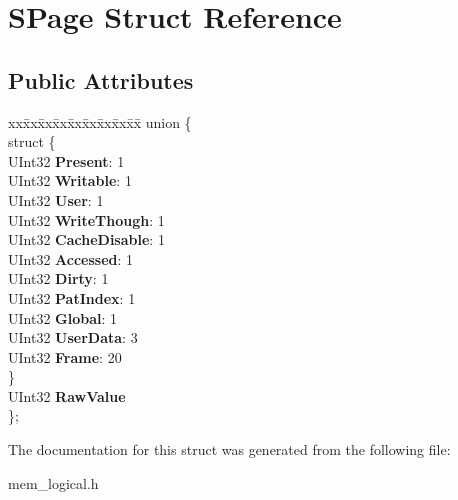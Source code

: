 \hypertarget{struct_s_page}{}\section{S\+Page Struct Reference}
\label{struct_s_page}
\subsection*{Public Attributes}
\begin{DoxyCompactItemize}
\item 
\mbox{\label{struct_s_page_a471494db4301c74e655d9178d6d98143}} 
\begin{tabbing}
xx\=xx\=xx\=xx\=xx\=xx\=xx\=xx\=xx\=\kill
union \{\\
\mbox{\label{union_s_page_1_1_0D22_a4ca04a5e242f5af34fafeb0bfaa527f7}} 
\>struct \{\\
\>\>UInt32 {\bfseries Present}: 1\\
\>\>UInt32 {\bfseries Writable}: 1\\
\>\>UInt32 {\bfseries User}: 1\\
\>\>UInt32 {\bfseries WriteThough}: 1\\
\>\>UInt32 {\bfseries CacheDisable}: 1\\
\>\>UInt32 {\bfseries Accessed}: 1\\
\>\>UInt32 {\bfseries Dirty}: 1\\
\>\>UInt32 {\bfseries PatIndex}: 1\\
\>\>UInt32 {\bfseries Global}: 1\\
\>\>UInt32 {\bfseries UserData}: 3\\
\>\>UInt32 {\bfseries Frame}: 20\\
\>\} \\
\>UInt32 {\bfseries RawValue}\\
\}; \\

\end{tabbing}\end{DoxyCompactItemize}


The documentation for this struct was generated from the following file\+:\begin{DoxyCompactItemize}
\item 
mem\+\_\+logical.\+h\end{DoxyCompactItemize}

